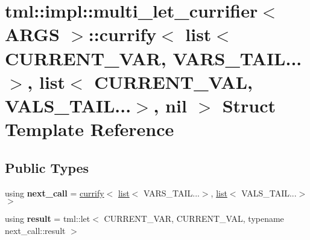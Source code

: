 \hypertarget{structtml_1_1impl_1_1multi__let__currifier_1_1currify_3_01list_3_01_c_u_r_r_e_n_t___v_a_r_00_01_eb6650de68f85d5dffec025b2ce9641c}{\section{tml\+:\+:impl\+:\+:multi\+\_\+let\+\_\+currifier$<$ A\+R\+G\+S $>$\+:\+:currify$<$ list$<$ C\+U\+R\+R\+E\+N\+T\+\_\+\+V\+A\+R, V\+A\+R\+S\+\_\+\+T\+A\+I\+L...$>$, list$<$ C\+U\+R\+R\+E\+N\+T\+\_\+\+V\+A\+L, V\+A\+L\+S\+\_\+\+T\+A\+I\+L...$>$, nil $>$ Struct Template Reference}
\label{structtml_1_1impl_1_1multi__let__currifier_1_1currify_3_01list_3_01_c_u_r_r_e_n_t___v_a_r_00_01_eb6650de68f85d5dffec025b2ce9641c}
}
\subsection*{Public Types}
\begin{DoxyCompactItemize}
\item 
\hypertarget{structtml_1_1impl_1_1multi__let__currifier_1_1currify_3_01list_3_01_c_u_r_r_e_n_t___v_a_r_00_01_eb6650de68f85d5dffec025b2ce9641c_a5dacf4be2ea2cea7e88ece32e5e13adc}{using {\bfseries next\+\_\+call} = \hyperlink{structtml_1_1impl_1_1multi__let__currifier_1_1currify}{currify}$<$ \hyperlink{structtml_1_1list}{list}$<$ V\+A\+R\+S\+\_\+\+T\+A\+I\+L...$>$, \hyperlink{structtml_1_1list}{list}$<$ V\+A\+L\+S\+\_\+\+T\+A\+I\+L...$>$$>$}\label{structtml_1_1impl_1_1multi__let__currifier_1_1currify_3_01list_3_01_c_u_r_r_e_n_t___v_a_r_00_01_eb6650de68f85d5dffec025b2ce9641c_a5dacf4be2ea2cea7e88ece32e5e13adc}

\item 
\hypertarget{structtml_1_1impl_1_1multi__let__currifier_1_1currify_3_01list_3_01_c_u_r_r_e_n_t___v_a_r_00_01_eb6650de68f85d5dffec025b2ce9641c_a1f1d26665731e0bab4ca7c8a6db8870f}{using {\bfseries result} = tml\+::let$<$ C\+U\+R\+R\+E\+N\+T\+\_\+\+V\+A\+R, C\+U\+R\+R\+E\+N\+T\+\_\+\+V\+A\+L, typename next\+\_\+call\+::result $>$}\label{structtml_1_1impl_1_1multi__let__currifier_1_1currify_3_01list_3_01_c_u_r_r_e_n_t___v_a_r_00_01_eb6650de68f85d5dffec025b2ce9641c_a1f1d26665731e0bab4ca7c8a6db8870f}

\end{DoxyCompactItemize}


